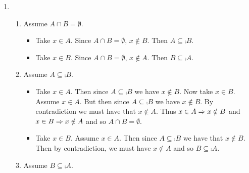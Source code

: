 \documentclass[11pt]{book}
\begin{document}
{\begin{enumerate}
\begin{enumerate}
\begin{itemize}
		\item Take $x \in A$. Then $x \in A \cup B = B$. Since $x \in A$ and $x \in B$ then $x \in A \cap B$ and so $A \subseteq A \cap B$. But since $A \cap B \subseteq A$ we have $A \cap B = A$.
		\end{itemize}
		\item Assume $A \cap B = A$.
		\begin{itemize}
		\item Take $x \in A$. Then $x \in A \cap B$ and so $x \in B$. Therefore $A \subseteq B$.
		\item Take $x \notin B$. Then $x \notin A \cap B$ and so $x \notin A$. Therefore $\comp{A} \supseteq \comp{B}$.
		\item Take $x \in A \cup B$. Then $x \in A$ or $x \in B$. Assume $x \notin B$. Then $x \notin A \cap B = A$ and so $x \notin A \cup B$. By contradiction, we must have the $x \in B$. Then $A \cup B \subseteq B$. But since $B \subseteq A \cup B$ we have that $A \cup B = B$.
		\end{itemize}
		\end{enumerate}
\item \begin{enumerate}
		\item Assume $A \cap B = \emptyset$.
		\begin{itemize}
			\item Take $x \in A$. Since $A \cap B = \emptyset$, $x \notin B$. Then $A \subseteq \comp{B}$.
			\item Take $x \in B$. Since $A \cap B = \emptyset$, $x \notin A$. Then $B \subseteq \comp{A}$.
		\end{itemize}
		\item Assume $A \subseteq \comp{B}$.
		\begin{itemize}
			\item Take $x \in A$. Then since $A \subseteq \comp{B}$ we have $x \notin B$. Now take $x \in B$. Assume $x \in A$. But then since $A \subseteq \comp{B}$ we have $x \notin B$. By contradiction we must have that $x \notin A$. Thus $x \in A \Rightarrow x \notin B$ and $x \in B \Rightarrow x \notin A$ and so $A \cap B = \emptyset$.
			\item Take $x \in B$. Assume $x \in A$. Then since $A \subseteq \comp{B}$ we have that $x \notin B$. Then by contradiction, we must have $x \notin A$ and so $B \subseteq \comp{A}$.
		\end{itemize}
		\item Assume $B \subseteq \comp{A}$.
		\begin{itemize}

\end{itemize}
\end{enumerate}
\end{enumerate}}
\end{document}
